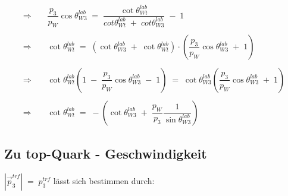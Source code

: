 \documentclass[
a4paper,                                %
twoside,                                %
BCOR1.4cm,                      %
ngerman,                                %
10pt,                           %
headings=normal,                %
headsepline,                    %
clearplainpage, %
final,                                  %
div=14,
parskip=full
]{scrbook}
\begin{document}
\begin{align}
\Rightarrow\;\;\;\; &
	\dfrac{p_{3}}{p_{W}} \cos \theta_{W3}^{lab}
\;=\;
	\dfrac{\cot \theta_{Wt}^{lab}}{cot \theta_{Wt}^{lab}\;+\;cot \theta_{W3}^{lab}}
	\;-\;1
\nonumber
\\
\nonumber
\\
\Rightarrow\;\;\;\; &
	\cot \theta_{Wt}^{lab}
\;=\;
	\left(\cot \theta_{W3}^{lab}\;+\;\cot \theta_{Wt}^{lab}\right)\cdot
	\left(\dfrac{p_{3}}{p_{W}} \cos \theta_{W3}^{lab}\;+\;1\right)
\nonumber
\\
\nonumber
\\
\Rightarrow\;\;\;\; &
	\cot \theta_{Wt}^{lab} 
	\left(1\;-\;\dfrac{p_{3}}{p_{W}} \cos \theta_{W3}^{lab}\;-\;1\right)
\;=\;
	\cot \theta_{W3}^{lab} 
	\left(\dfrac{p_{3}}{p_{W}} \cos \theta_{W3}^{lab}\;+\;1\right)
\nonumber
\\
\nonumber
\\
\Rightarrow\;\;\;\; &
	\cot \theta_{Wt}^{lab} 
\;=\;
	-\left(\cot \theta_{W3}^{lab}
	\;+\;\dfrac{p_{W}}{p_{3}} \dfrac{1}{\sin \theta_{W3}^{lab}}\right)
\end{align}

\subsection{Zu top-Quark - Geschwindigkeit}\label{anhangbetat}

$ |\vec{p}_{3}^{trf}|\;=\;p_{3}^{trf} $ l\"asst sich bestimmen durch:
\end{document}
